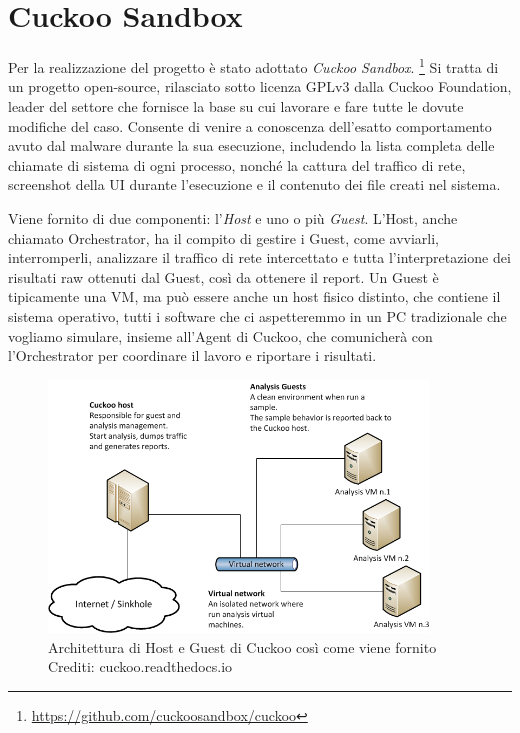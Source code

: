 \section{Cuckoo Sandbox}
Per la realizzazione del progetto è stato adottato \emph{Cuckoo Sandbox}.
\footnote{\url{https://github.com/cuckoosandbox/cuckoo}}
Si tratta di un progetto open-source, rilasciato sotto licenza GPLv3 dalla Cuckoo Foundation, leader del settore che fornisce la base su cui lavorare e fare tutte le dovute modifiche del caso.
Consente di venire a conoscenza dell'esatto comportamento avuto dal malware durante la sua esecuzione, includendo la lista completa delle chiamate di sistema di ogni processo, nonché la cattura del traffico di rete, screenshot della UI durante l'esecuzione e il contenuto dei file creati nel sistema.

Viene fornito di due componenti: l'\emph{Host} e uno o più \emph{Guest}.
L'Host, anche chiamato Orchestrator, ha il compito di gestire i Guest, come avviarli, interromperli, analizzare il traffico di rete intercettato e tutta l'interpretazione dei risultati raw ottenuti dal Guest, così da ottenere il report.
Un Guest è tipicamente una VM, ma può essere anche un host fisico distinto, che contiene il sistema operativo, tutti i software che ci aspetteremmo in un PC tradizionale che vogliamo simulare, insieme all'Agent di Cuckoo, che comunicherà con l'Orchestrator per coordinare il lavoro e riportare i risultati.

\begin{figure}[htbp]
    \centering
    \includegraphics[width=0.9\textwidth]{assets/cuckoo_default_architecture.png}
    \caption{Architettura di Host e Guest di Cuckoo così come viene fornito \\ Crediti: cuckoo.readthedocs.io}
    \label{fig:cuckoo_default_architecture}
\end{figure}

